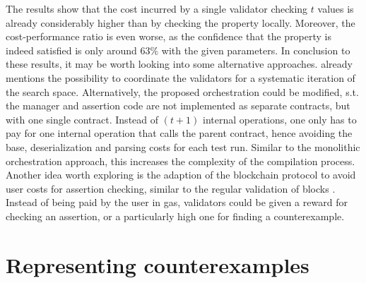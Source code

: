 The results show that the cost incurred by a single validator checking $t$ values is already considerably higher than by checking the property locally. Moreover, the cost-performance ratio is even worse, as the confidence that the property is indeed satisfied is only around 63\% with the given parameters. In conclusion to these results, it may be worth looking into some alternative approaches.  already mentions the possibility to coordinate the validators for a systematic iteration of the search space. Alternatively, the proposed orchestration could be modified, s.t. the manager and assertion code are not implemented as separate contracts, but with one single contract. Instead of $(t+1)$ internal operations, one only has to pay for one internal operation that calls the parent contract, hence avoiding the base, deserialization and parsing costs for each test run. Similar to the monolithic orchestration approach, this increases the complexity of the compilation process.\\ Another idea worth exploring is the adaption of the blockchain protocol to avoid user costs for assertion checking, similar to the regular validation of blocks \cite{tezos_docs}. Instead of being paid by the user in gas, validators could be given a reward for checking an assertion, or a particularly high one for finding a counterexample. 


\section{Representing counterexamples}\label{sec:counterexample}

